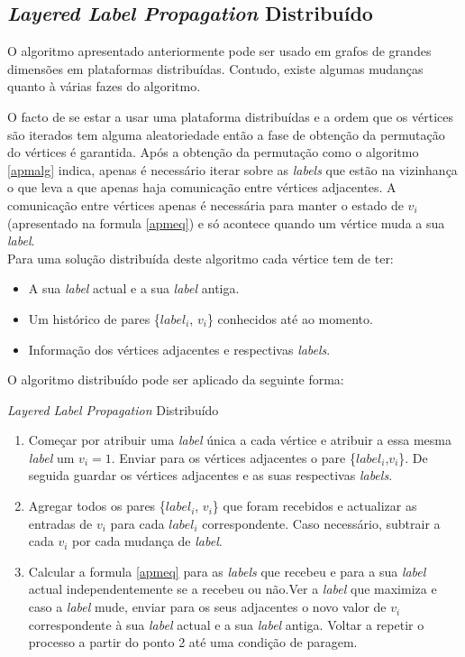 \newpage
\subsection{\textit{Layered Label Propagation} Distribuído}

O algoritmo apresentado anteriormente pode ser usado em grafos de grandes dimensões em plataformas distribuídas. Contudo, existe algumas mudanças quanto à várias fazes do algoritmo. 

  O facto de se estar a usar uma plataforma distribuídas e a ordem que os vértices são iterados tem alguma aleatoriedade então a fase de obtenção da permutação do vértices é garantida. Após a obtenção da permutação como o algoritmo \ref{apmalg} indica, apenas é necessário iterar sobre as \textit{labels} que estão na vizinhança o que leva a que apenas haja comunicação entre vértices adjacentes. A comunicação entre vértices apenas é necessária para manter o estado de $v_i$ (apresentado na formula \ref{apmeq}) e só acontece quando um vértice muda a sua \textit{label}.
  \\[0,25cm]
  Para uma solução distribuída deste algoritmo cada vértice tem de ter:
  \begin{itemize}
   \item A sua \textit{label} actual e a sua \textit{label} antiga.
   \item Um histórico de pares \{$label_i$, $v_i$\} conhecidos até ao momento.
   \item Informação dos vértices adjacentes e respectivas \textit{labels}. 
  \\[0,25cm]
  \end{itemize}
  
  O algoritmo distribuído pode ser aplicado da seguinte forma:
  \begin{algorithm}
    \caption{\textit{Layered Label Propagation} Distribuído}\label{llpdistributed}
    \begin{enumerate}
      \item Começar por atribuir uma \textit{label} única a cada vértice e atribuir a essa mesma \textit{label} um $v_i=1$. Enviar para os vértices adjacentes o pare \{$label_i$,$v_i$\}. De seguida guardar os vértices adjacentes e as suas respectivas \textit{labels}.
      \item Agregar todos os pares \{$label_i$, $v_i$\} que foram recebidos e actualizar as entradas de $v_i$ para cada $label_i$ correspondente. Caso necessário, subtrair a cada $v_i$ por cada mudança de \textit{label}.
      \item Calcular a formula \ref{apmeq} para as \textit{labels} que recebeu e para a sua \textit{label} actual independentemente se a recebeu ou não.Ver a \textit{label} que maximiza e caso a \textit{label} mude, enviar para os seus adjacentes o novo valor de $v_i$ correspondente à sua \textit{label} actual e a sua \textit{label} antiga. Voltar a repetir o processo a partir do ponto 2 até uma condição de paragem.
    \end{enumerate}
  \end{algorithm}
